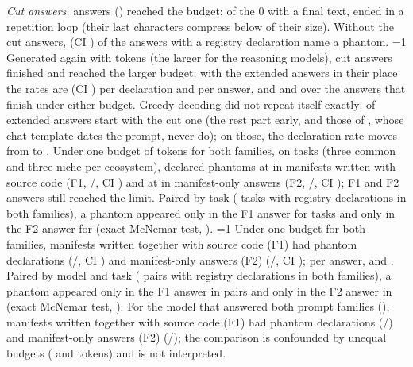 \documentclass[conference]{IEEEtran}
\providecommand{\rHasExt}{0}\providecommand{\rFamEqualBudget}{0}\providecommand{\rCutText}{0}\providecommand{\rPersistUnasked}{0}
\begin{document}
\emph{Cut answers.} \rNTrunc{} answers (\rTruncPct) reached the budget; of the \rCutText{} with a final text, \rCutLoop{}
ended in a repetition loop (their last \rLoopChars{} characters compress below \rLoopZlib{} of their size). Without the cut
answers, \rPhantomRespNoTrunc{} (CI \rPhantomRespNoTruncCI) of the answers with a registry declaration name a phantom.
\fi
\ifnum\rHasExt=1
Generated again with \rExtBudget{} tokens (the larger for the reasoning models), \rExtFinished{} cut answers finished and \rExtStillCut{} reached the larger
budget; with the extended answers in their place the rates are \rExtAllDecl{} (CI \rExtAllDeclCI) per declaration and
\rExtAllResp{} per answer, and \rExtFinDecl{} and \rExtFinResp{} over the answers that finish under either budget.
Greedy decoding did not repeat itself exactly: \rExtUndatedKept{} of \rExtUndatedN{} extended answers start with the
cut one (the rest part early, and those of \rExtDatedModels, whose chat template dates the prompt, never do); on those,
the declaration rate moves from \rExtKeptCutDecl{} to \rExtKeptExtDecl.
\fi
\ifnum{}
Under one budget of \rFamEqBudget{} tokens for both families, on \rFamEqTasks{} tasks (three common and three niche per
ecosystem), \rFamEqModel{} declared phantoms at \rFamEqFOneDecl{} in manifests written with source code (F1,
\rFamEqFOneK/\rFamEqFOneN, CI \rFamEqFOneDeclCI) and at \rFamEqFTwoDecl{} in manifest-only answers (F2,
\rFamEqFTwoK/\rFamEqFTwoN, CI \rFamEqFTwoDeclCI); \rFamEqFOneTrunc{} F1 and \rFamEqFTwoTrunc{} F2 answers still reached
the limit. Paired by task (\rFamEqPairs{} tasks with registry declarations in both families), a phantom appeared only
in the F1 answer for \rFamEqOnlyFOne{} task\ifnum{}\else s\fi{} and only in the F2 answer for
\rFamEqOnlyFTwo{} (exact McNemar test,
\rFamEqMcNemarP).
\else\ifnum{}
\ifnum\rFamEqualBudget=1
Under one budget for both families, manifests written together with source code (F1) had \rFamFOneDecl{} phantom
declarations (\rFamFOneK/\rFamFOneN, CI \rFamFOneDeclCI) and manifest-only answers (F2) \rFamFTwoDecl{}
(\rFamFTwoK/\rFamFTwoN, CI \rFamFTwoDeclCI); per answer, \rFamFOneResp{} and \rFamFTwoResp. Paired by model and task
(\rFamPairs{} pairs with registry declarations in both families), a phantom appeared only in the F1 answer in
\rFamOnlyFOne{} pairs and only in the F2 answer in \rFamOnlyFTwo{} (exact McNemar test, \rFamMcNemarP).
\else
For the model that answered both prompt families (\rFamCmpModels), manifests written together with source code (F1)
had \rFamFOneDecl{} phantom declarations (\rFamFOneK/\rFamFOneN) and manifest-only answers (F2) \rFamFTwoDecl{}
(\rFamFTwoK/\rFamFTwoN); the comparison is confounded by unequal budgets (\rMaxTokFOne{} and \rMaxTokFTwo{} tokens)
and is not interpreted.
\fi
\fi\fi
\end{document}
